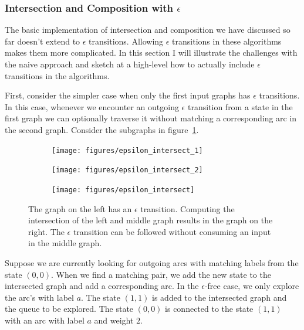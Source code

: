 \subsubsection{Intersection and Composition with $\epsilon$}
\label{sec:epsilon_intersect}

The basic implementation of intersection and composition we have discussed so
far doesn't extend to $\epsilon$ transitions. Allowing $\epsilon$ transitions
in these algorithms makes them more complicated. In this section I will
illustrate the challenges with the naive approach and sketch at a high-level
how to actually include $\epsilon$ transitions in the algorithms.

First, consider the simpler case when only the first input graphs has
$\epsilon$ transitions. In this case, whenever we encounter an outgoing
$\epsilon$ transition from a state in the first graph we can optionally
traverse it without matching a corresponding arc in the second graph. Consider
the subgraphs in figure~\ref{fig:epsilon_intersect}.

\begin{figure}
    \centering
    \begin{subfigure}{0.32\textwidth}
        \centering
        \texttt{[image: figures/epsilon\_intersect\_1]}
    \end{subfigure}
    \begin{subfigure}{0.32\textwidth}
        \centering
        \texttt{[image: figures/epsilon\_intersect\_2]}
    \end{subfigure}
    \begin{subfigure}{0.32\textwidth}
        \centering
        \texttt{[image: figures/epsilon\_intersect]}
    \end{subfigure}
    \caption{The graph on the left has an $\epsilon$ transition. Computing the
    intersection of the left and middle graph results in the graph on the
    right. The $\epsilon$ transition can be followed without consuming an input
    in the middle graph.}
    \label{fig:epsilon_intersect}
\end{figure}

Suppose we are currently looking for outgoing arcs with matching labels from
the state $(0, 0)$. When we find a matching pair, we add the new state to the
intersected graph and add a corresponding arc. In the $\epsilon$-free case, we
only explore the arc's with label $a$. The state $(1, 1)$ is added to the
intersected graph and the queue to be explored. The state $(0, 0)$ is connected
to the state $(1, 1)$ with an arc with label $a$ and weight $2$.

